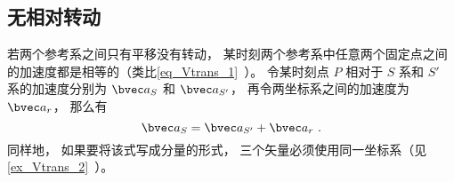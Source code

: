 

\subsection{无相对转动}
若两个参考系之间只有平移没有转动， 某时刻两个参考系中任意两个固定点之间的加速度都是相等的（类比\autoref{eq_Vtrans_1}~）。 令某时刻点 $P$ 相对于 $S$ 系和 $S'$ 系的加速度分别为 $\bvec a_S$ 和 $\bvec a_{S'}$， 再令两坐标系之间的加速度为 $\bvec a_r$， 那么有
\begin{equation}\label{eq_AccTra_1}
\bvec a_S = \bvec a_{S'} + \bvec a_r~.
\end{equation}
同样地， 如果要将该式写成分量的形式， 三个矢量必须使用同一坐标系（见\autoref{ex_Vtrans_2}~）。

